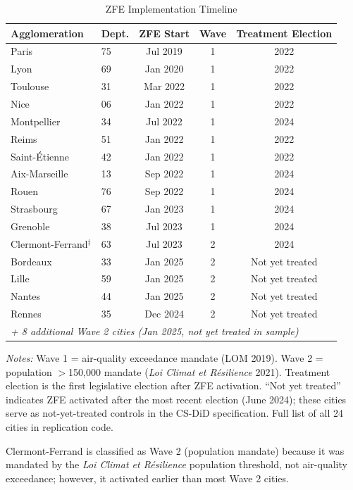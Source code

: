 \documentclass[12pt]{article}
\begin{document}
\begin{table}[H]
\centering
\caption{ZFE Implementation Timeline}
\label{tab:zfe_timeline}
\begin{threeparttable}
\begin{tabular}{llccc}
\toprule
Agglomeration & Dept. & ZFE Start & Wave & Treatment Election \\
\midrule
Paris & 75 & Jul 2019 & 1 & 2022 \\
Lyon & 69 & Jan 2020 & 1 & 2022 \\
Toulouse & 31 & Mar 2022 & 1 & 2022 \\
Nice & 06 & Jan 2022 & 1 & 2022 \\
Montpellier & 34 & Jul 2022 & 1 & 2024 \\
Reims & 51 & Jan 2022 & 1 & 2022 \\
Saint-\'Etienne & 42 & Jan 2022 & 1 & 2022 \\
Aix-Marseille & 13 & Sep 2022 & 1 & 2024 \\
Rouen & 76 & Sep 2022 & 1 & 2024 \\
Strasbourg & 67 & Jan 2023 & 1 & 2024 \\
Grenoble & 38 & Jul 2023 & 1 & 2024 \\
Clermont-Ferrand$^\ddagger$ & 63 & Jul 2023 & 2 & 2024 \\
Bordeaux & 33 & Jan 2025 & 2 & Not yet treated \\
Lille & 59 & Jan 2025 & 2 & Not yet treated \\
Nantes & 44 & Jan 2025 & 2 & Not yet treated \\
Rennes & 35 & Dec 2024 & 2 & Not yet treated \\
\multicolumn{5}{l}{\textit{+ 8 additional Wave 2 cities (Jan 2025, not yet treated in sample)}} \\
\bottomrule
\end{tabular}
\begin{tablenotes}[flushleft]
\small
\item \textit{Notes:} Wave 1 = air-quality exceedance mandate (LOM 2019). Wave 2 = population $>$150,000 mandate (\textit{Loi Climat et R\'esilience} 2021). Treatment election is the first legislative election after ZFE activation. ``Not yet treated'' indicates ZFE activated after the most recent election (June 2024); these cities serve as not-yet-treated controls in the CS-DiD specification. Full list of all 24 cities in replication code.
\item[$\ddagger$] Clermont-Ferrand is classified as Wave 2 (population mandate) because it was mandated by the \textit{Loi Climat et R\'esilience} population threshold, not air-quality exceedance; however, it activated earlier than most Wave 2 cities.
\end{tablenotes}
\end{threeparttable}
\end{table}
\end{document}
